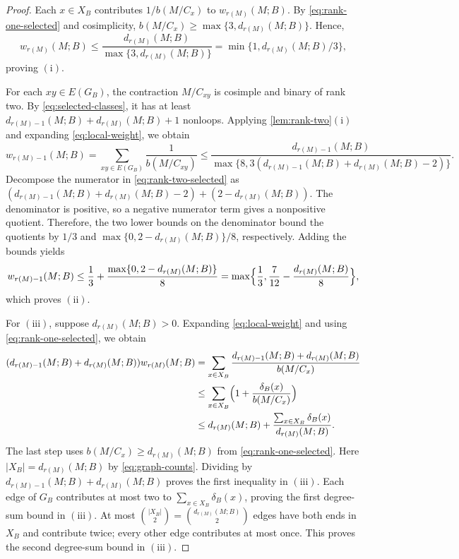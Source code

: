 \documentclass[10pt,a4paper]{article}
\numberwithin{equation}{section}
\newcommand{\wloc}[1]{w_{#1}(M;B)}
\newcommand{\dloc}[1]{d_{#1}(M;B)}
\begin{document}
\begin{proof}
Each \(x\in X_B\) contributes \(1/b(M/C_x)\) to \(\wloc{r(M)}\).
By \eqref{eq:rank-one-selected} and cosimplicity,
\(b(M/C_x)\ge\max\{3,\dloc{r(M)}\}\). Hence,
\[
 \wloc{r(M)}\le
 \frac{\dloc{r(M)}}{\max\{3,\dloc{r(M)}\}}
 =\min\{1,\dloc{r(M)}/3\},
\]
proving \(\mathrm{(i)}\).

For each \(xy\in E(G_B)\), the contraction \(M/C_{xy}\)
is cosimple and binary of rank two. By \eqref{eq:selected-classes},
it has at least \(\dloc{r(M)-1}+\dloc{r(M)}+1\) nonloops.
Applying \autoref{lem:rank-two}\(\mathrm{(i)}\) and
expanding \eqref{eq:local-weight}, we obtain
\begin{equation}\label{eq:rank-two-selected}
 \wloc{r(M)-1}=\sum_{xy\in E(G_B)}\frac1{b(M/C_{xy})}\le\frac{\dloc{r(M)-1}}{\max\{8,3(\dloc{r(M)-1}+\dloc{r(M)}-2)\}}.
\end{equation}
Decompose the numerator in \eqref{eq:rank-two-selected} as
\((\dloc{r(M)-1}+\dloc{r(M)}-2)+(2-\dloc{r(M)})\).
The denominator is positive, so a negative numerator term gives
a nonpositive quotient. Therefore, the two lower bounds on the denominator
bound the quotients by \(1/3\) and
\(\max\{0,2-\dloc{r(M)}\}/8\), respectively. Adding the bounds yields
\[
 \wloc{r(M)-1}\le\frac13+\frac{\max\{0,2-\dloc{r(M)}\}}8
 =\max\Bigl\{\frac13,\frac7{12}-\frac{\dloc{r(M)}}8\Bigr\},
\]
which proves \(\mathrm{(ii)}\).

For \(\mathrm{(iii)}\), suppose \(\dloc{r(M)}>0\).
Expanding \eqref{eq:local-weight} and using \eqref{eq:rank-one-selected}, we obtain
\begin{align*}
 (\dloc{r(M)-1}+\dloc{r(M)})\wloc{r(M)}&=\sum_{x\in X_B}\frac{\dloc{r(M)-1}+\dloc{r(M)}}{b(M/C_x)}\\
 &\le\sum_{x\in X_B}\Bigl(1+\frac{\delta_B(x)}{b(M/C_x)}\Bigr)\\
 &\le\dloc{r(M)}+\frac{\sum_{x\in X_B}\delta_B(x)}{\dloc{r(M)}}.
\end{align*}
The last step uses \(b(M/C_x)\ge\dloc{r(M)}\) from
\eqref{eq:rank-one-selected}.
Here \(|X_B|=\dloc{r(M)}\) by \eqref{eq:graph-counts}.
Dividing by \(\dloc{r(M)-1}+\dloc{r(M)}\) proves the first inequality in
\(\mathrm{(iii)}\).
Each edge of \(G_B\) contributes at most two to
\(\sum_{x\in X_B}\delta_B(x)\), proving the first degree-sum bound in
\(\mathrm{(iii)}\).
At most \(\binom{|X_B|}2=\binom{\dloc{r(M)}}2\) edges have both ends in
\(X_B\) and contribute twice; every other edge contributes at most once.
This proves the second degree-sum bound in \(\mathrm{(iii)}\).


\end{proof}
\end{document}
